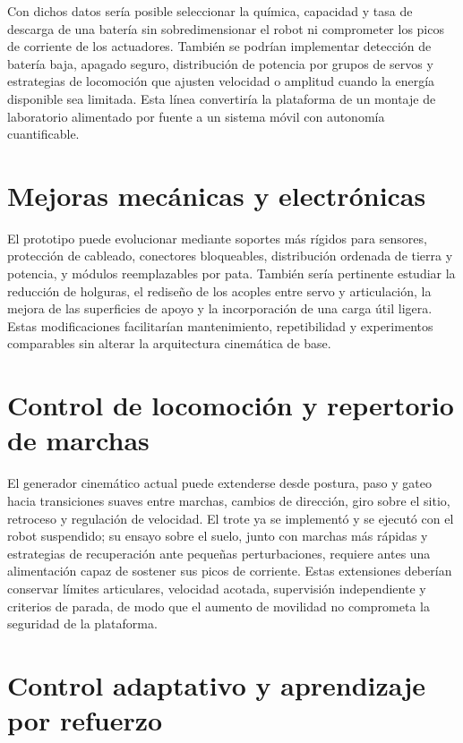 Con dichos datos sería posible seleccionar la química, capacidad y tasa de
descarga de una batería sin sobredimensionar el robot ni comprometer los picos
de corriente de los actuadores. También se podrían implementar detección de
batería baja, apagado seguro, distribución de potencia por grupos de servos y
estrategias de locomoción que ajusten velocidad o amplitud cuando la energía
disponible sea limitada. Esta línea convertiría la plataforma de un montaje de
laboratorio alimentado por fuente a un sistema móvil con autonomía cuantificable.

\section{Mejoras mecánicas y electrónicas}

El prototipo puede evolucionar mediante soportes más rígidos para sensores,
protección de cableado, conectores bloqueables, distribución ordenada de tierra
y potencia, y módulos reemplazables por pata. También sería pertinente estudiar
la reducción de holguras, el rediseño de los acoples entre servo y articulación,
la mejora de las superficies de apoyo y la incorporación de una carga útil
ligera. Estas modificaciones facilitarían mantenimiento, repetibilidad y
experimentos comparables sin alterar la arquitectura cinemática de base.

\section{Control de locomoción y repertorio de marchas}

El generador cinemático actual puede extenderse desde postura, paso y gateo
hacia transiciones suaves entre marchas, cambios de dirección, giro sobre el
sitio, retroceso y regulación de velocidad. El trote ya se implementó y se
ejecutó con el robot suspendido; su ensayo sobre el suelo, junto con marchas más
rápidas y estrategias de recuperación ante pequeñas perturbaciones, requiere
antes una alimentación capaz de sostener sus picos de corriente. Estas
extensiones deberían conservar límites articulares, velocidad acotada,
supervisión independiente y criterios de parada, de modo que el aumento de
movilidad no comprometa la seguridad de la plataforma.

\section{Control adaptativo y aprendizaje por refuerzo}

